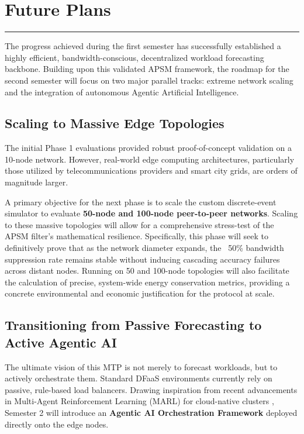 \chapter{Future Plans}
\noindent \rule{6.6in}{0.01in}
\vspace{0.5cm}

The progress achieved during the first semester has successfully established a highly efficient, bandwidth-conscious, decentralized workload forecasting backbone. Building upon this validated APSM framework, the roadmap for the second semester will focus on two major parallel tracks: extreme network scaling and the integration of autonomous Agentic Artificial Intelligence.

\section{Scaling to Massive Edge Topologies}
The initial Phase 1 evaluations provided robust proof-of-concept validation on a 10-node network. However, real-world edge computing architectures, particularly those utilized by telecommunications providers and smart city grids, are orders of magnitude larger. 

A primary objective for the next phase is to scale the custom discrete-event simulator to evaluate \textbf{50-node and 100-node peer-to-peer networks}. Scaling to these massive topologies will allow for a comprehensive stress-test of the APSM filter's mathematical resilience. Specifically, this phase will seek to definitively prove that as the network diameter expands, the ~50\% bandwidth suppression rate remains stable without inducing cascading accuracy failures across distant nodes. Running on 50 and 100-node topologies will also facilitate the calculation of precise, system-wide energy conservation metrics, providing a concrete environmental and economic justification for the protocol at scale.

\section{Transitioning from Passive Forecasting to Active Agentic AI}
The ultimate vision of this MTP is not merely to forecast workloads, but to actively orchestrate them. Standard DFaaS environments currently rely on passive, rule-based load balancers. Drawing inspiration from recent advancements in Multi-Agent Reinforcement Learning (MARL) for cloud-native clusters \cite{yao2025multi}, Semester 2 will introduce an \textbf{Agentic AI Orchestration Framework} deployed directly onto the edge nodes.

